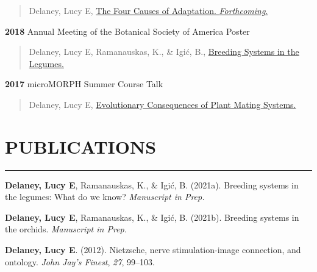 \documentclass[]{resume}
\newlength{\cslhangindent}
\newenvironment{cslreferences}
{\setlength{\parindent}{0pt}
\everypar{\setlength{\hangindent}{\cslhangindent}}\ignorespaces}
{\par}
\begin{document}
\begin{quote}Delaney, Lucy E, \href{NA}{The Four Causes of Adaptation. \textit{Forthcoming}.}\end{quote}

\textbf{2018} Annual Meeting of the Botanical Society of America
\hspace{1mm}\textbar{}\hspace{1mm} Poster \vspace{-0.25cm}

\begin{quote}Delaney, Lucy E, Ramanauskas, K., \& Igi\'c, B., \href{https://ledelaney.org/static/posters/poster.png}{Breeding Systems in the Legumes.}\end{quote}

\textbf{2017} microMORPH Summer Course
\hspace{1mm}\textbar{}\hspace{1mm} Talk \vspace{-0.25cm}

\begin{quote}Delaney, Lucy E, \href{https://www.dropbox.com/s/o7hcg5riw97wf9i/08-2017-microMORPH.pdf?dl=1}{Evolutionary Consequences of Plant Mating Systems.}\end{quote}

\hypertarget{publications}{%
\section{PUBLICATIONS}\label{publications}}

\hrule
\setlength{\leftmargin}{1.8em}

\hypertarget{refs}{}
\begin{cslreferences}
\leavevmode\hypertarget{ref-delaney2021}{}%
\textbf{Delaney, Lucy E}, Ramanauskas, K., \& Igić, B. (2021a). Breeding
systems in the legumes: What do we know? \emph{Manuscript in Prep.}

\leavevmode\hypertarget{ref-delaney2021a}{}%
\textbf{Delaney, Lucy E}, Ramanauskas, K., \& Igić, B. (2021b). Breeding
systems in the orchids. \emph{Manuscript in Prep.}

\leavevmode\hypertarget{ref-delaney2012}{}%
\textbf{Delaney, Lucy E}. (2012). Nietzsche, nerve stimulation-image
connection, and ontology. \emph{John Jay's Finest}, \emph{27}, 99--103.
\end{cslreferences}

\end{document}
